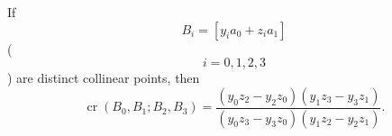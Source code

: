 If $$B_i = [y_i a_0 + z_i a_1]$$ ($$i = 0, 1, 2, 3$$) are distinct collinear points, then
$$\operatorname{cr}(B_0, B_1; B_2, B_3) = \frac{(y_0 z_2 - y_2 z_0)(y_1 z_3 - y_3 z_1)}{(y_0 z_3 - y_3 z_0)(y_1 z_2 - y_2 z_1)}.$$
